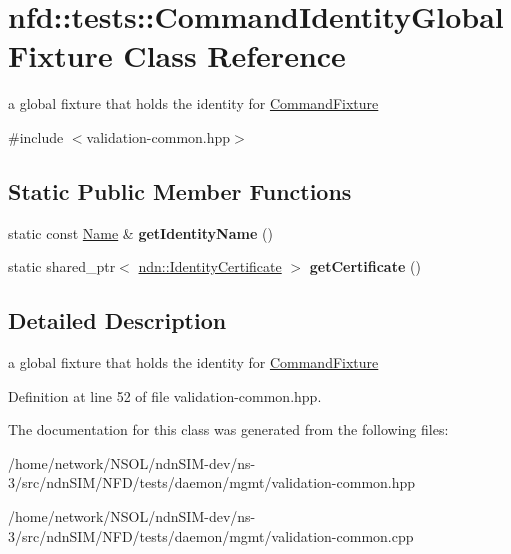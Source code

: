 \hypertarget{classnfd_1_1tests_1_1CommandIdentityGlobalFixture}{}\section{nfd\+:\+:tests\+:\+:Command\+Identity\+Global\+Fixture Class Reference}
\label{classnfd_1_1tests_1_1CommandIdentityGlobalFixture}


a global fixture that holds the identity for \hyperlink{classnfd_1_1tests_1_1CommandFixture}{Command\+Fixture}  




{\ttfamily \#include $<$validation-\/common.\+hpp$>$}

\subsection*{Static Public Member Functions}
\begin{DoxyCompactItemize}
\item 
static const \hyperlink{classndn_1_1Name}{Name} \& {\bfseries get\+Identity\+Name} ()\hypertarget{classnfd_1_1tests_1_1CommandIdentityGlobalFixture_ad79ffa63571f1981445faeab83e12bb5}{}\label{classnfd_1_1tests_1_1CommandIdentityGlobalFixture_ad79ffa63571f1981445faeab83e12bb5}

\item 
static shared\+\_\+ptr$<$ \hyperlink{classndn_1_1IdentityCertificate}{ndn\+::\+Identity\+Certificate} $>$ {\bfseries get\+Certificate} ()\hypertarget{classnfd_1_1tests_1_1CommandIdentityGlobalFixture_a3e8b05acee5b09d42bd8bdfd007e1fd5}{}\label{classnfd_1_1tests_1_1CommandIdentityGlobalFixture_a3e8b05acee5b09d42bd8bdfd007e1fd5}

\end{DoxyCompactItemize}


\subsection{Detailed Description}
a global fixture that holds the identity for \hyperlink{classnfd_1_1tests_1_1CommandFixture}{Command\+Fixture} 

Definition at line 52 of file validation-\/common.\+hpp.



The documentation for this class was generated from the following files\+:\begin{DoxyCompactItemize}
\item 
/home/network/\+N\+S\+O\+L/ndn\+S\+I\+M-\/dev/ns-\/3/src/ndn\+S\+I\+M/\+N\+F\+D/tests/daemon/mgmt/validation-\/common.\+hpp\item 
/home/network/\+N\+S\+O\+L/ndn\+S\+I\+M-\/dev/ns-\/3/src/ndn\+S\+I\+M/\+N\+F\+D/tests/daemon/mgmt/validation-\/common.\+cpp\end{DoxyCompactItemize}
